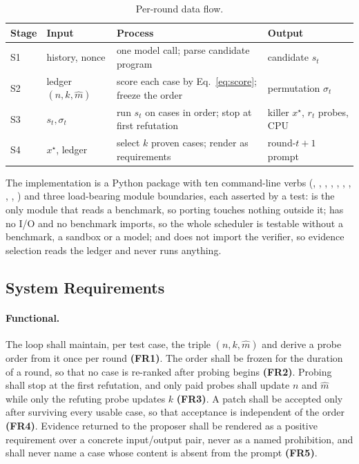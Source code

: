 \begin{table}[H]
\centering
\caption{Per-round data flow.}
\label{tab:dataflow}
\small
\begin{tabularx}{\textwidth}{@{}l l X l@{}}
\toprule
Stage & Input & Process & Output\\
\midrule
S1 & history, nonce & one model call; parse candidate program & candidate $s_t$\\
S2 & ledger $(n,k,\hat m)$ & score each case by Eq.~\eqref{eq:score}; freeze the order & permutation $\sigma_t$\\
S3 & $s_t, \sigma_t$ & run $s_t$ on cases in order; stop at first refutation & killer $x^\star$, $r_t$ probes, CPU\\
S4 & $x^\star$, ledger & select $k$ proven cases; render as requirements & round-$t{+}1$ prompt\\
\bottomrule
\end{tabularx}
\end{table}

The implementation is a Python package with ten command-line verbs
(, , , , ,
, , , , )
and three load-bearing module boundaries, each asserted by a test:
 is the only module that reads a benchmark, so porting touches
nothing outside it;  has no I/O and no benchmark imports,
so the whole scheduler is testable without a benchmark, a sandbox or a model;
and  does not import the verifier, so evidence selection reads the
ledger and never runs anything.

\subsection{System Requirements}

\paragraph{Functional.} The loop shall maintain, per test case, the triple
$(n, k, \hat m)$ and derive a probe order from it once per round \textbf{(FR1)}.
The order shall be frozen for the duration of a round, so that no case is
re-ranked after probing begins \textbf{(FR2)}. Probing shall stop at the first
refutation, and only paid probes shall update $n$ and $\hat m$ while only the
refuting probe updates $k$ \textbf{(FR3)}. A patch shall be accepted only after
surviving every usable case, so that acceptance is independent of the order
\textbf{(FR4)}. Evidence returned to the proposer shall be rendered as a
positive requirement over a concrete input/output pair, never as a named
prohibition, and shall never name a case whose content is absent from the
prompt \textbf{(FR5)}.

